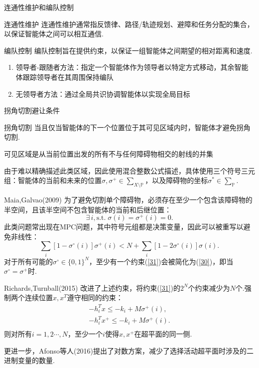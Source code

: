\documentclass[notheorems,11pt]{beamer}
\theoremstyle{plain}
\numberwithin{theorem}{section}
\numberwithin{lemma}{section}
\numberwithin{corollary}{section}
\theoremstyle{example}
\begin{document}
\begin{frame}{连通性维护和编队控制}
  \begin{block}{连通性维护}
    连通性维护通常指反馈律、路径/轨迹规划、避障和任务分配的集合，以保证智能体之间可以相互通信.
  \end{block}
  \begin{block}{编队控制}
    编队控制旨在提供约束，以保证一组智能体之间期望的相对距离和速度.
  \end{block}
  \begin{enumerate}
    \item 领导者-跟随者方法：指定一个智能体作为领导者以特定方式移动，其余智能体跟踪领导者在其周围保持编队
    \item 无领导者方法：通过全局共识协调智能体以实现全局目标
  \end{enumerate}
\end{frame}

\begin{frame}{拐角切割避让条件}
  \begin{block}{拐角切割}
    当且仅当智能体的下一个位置位于其可见区域内时，智能体才避免拐角切割.\par
    可见区域是从当前位置出发的所有不与任何障碍物相交的射线的并集
  \end{block}
  由于难以精确描述此类区域，因此使用混合整数公式描述，具体使用三个符号三元组：智能体的当前和未来的位置$\sigma,\sigma^+\in \textstyle\sum_{X\setminus\mathbb{P}}$，以及障碍物的坐标$\sigma^*\in\textstyle\sum_{\mathbb{P}}$.
\end{frame}

\begin{frame}{Maia,Galvao(2009)}
  为了避免切割单个障碍物，必须存在至少一个包含该障碍物的半空间，且该半空间不包含智能体的当前和后继位置：
  \begin{equation}
    \exists\, i,\mathrm{s.t.}\; \sigma(i)=\sigma^+(i)=0 .\label{30}
  \end{equation}
  此类问题常出现在MPC问题，其中符号元组都是决策变量，因此可以被重写以避免非线性：
  \begin{equation}
    \sum_{i}[1-\sigma^\circ(i)]\sigma^+(i)<N+\sum_{i}[1-2\sigma^\circ(i)]\sigma(i). \label{31}
  \end{equation}
  对于所有可能的$\sigma^\circ\in\{0,1\}^N$，至少有一个约束(\ref{31})会被简化为(\ref{30})，即当$\sigma^\circ=\sigma^+$时.
\end{frame}

\begin{frame}{Richards,Turnball(2015)}
  改进了上述约束，将约束(\ref{31})的$2^N$个约束减少为$N$个.强制两个连续位置$x,x^T$遵守相同的约束：
  \begin{gather*}
    -h_i^Tx\leqslant -k_i+M\sigma^+(i), \\
    -h_i^Tx^+\leqslant -k_i+M\sigma^+(i). \\
  \end{gather*}
  则对所有$i=1,2\cdots,N$，至少一个$i$使得$x,x^+$在超平面的同一侧.\par
  更进一步，Afonso等人(2016)提出了对数方案，减少了选择活动超平面时涉及的二进制变量的数量.
\end{frame}
\end{document}
